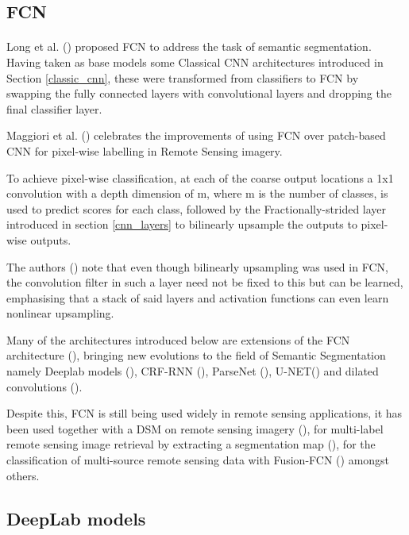 \subsection{\gls{FCN}} 
\paragraph{}
Long et al. (\cite{long2015fully}) proposed \gls{FCN} to address the task of semantic segmentation. Having taken as base models some Classical \gls{CNN} architectures introduced in Section \ref{classic_cnn}, these were transformed from classifiers to \gls{FCN} by swapping the fully connected layers with convolutional layers and dropping the final classifier layer. 

Maggiori et al. (\cite{7730322}) celebrates the improvements of using \gls{FCN} over patch-based \gls{CNN} for pixel-wise labelling in Remote Sensing imagery.

To achieve pixel-wise classification, at each of the coarse output locations a 1x1 convolution with a depth dimension of m, where m is the number of classes, is used to predict scores for each class, followed by the Fractionally-strided layer introduced in section \ref{cnn_layers} to bilinearly upsample the outputs to pixel-wise outputs. 

The authors (\cite{long2015fully}) note that even though bilinearly upsampling was used in \gls{FCN}, the convolution filter in such a layer need not be fixed to this but can be learned, emphasising that a stack of said layers and activation functions can even learn nonlinear upsampling.

Many of the architectures introduced below are extensions of the \gls{FCN} architecture (\cite{long2015fully}), bringing new evolutions to the field of Semantic Segmentation namely Deeplab models (\cite{chen2016semantic}), \gls{CRF}-\gls{RNN} (\cite{Zheng_2015}), ParseNet (\cite{liu2015parsenet}), U-NET(\cite{ronneberger2015unet}) and dilated convolutions (\cite{yu2016multiscale}).

Despite this, \gls{FCN} is still being used widely in remote sensing applications, it has been used together with a \gls{DSM} on remote sensing imagery (\cite{8281008}), for multi-label remote sensing image retrieval by extracting a segmentation map (\cite{8954885}), for the classification of multi-source remote sensing data with  Fusion-\gls{FCN} (\cite{8518295}) amongst others.

\subsection{DeepLab models}
